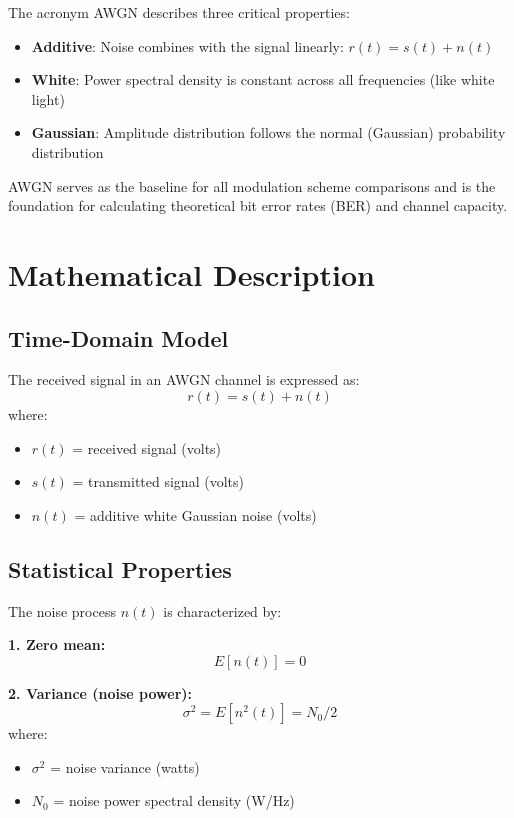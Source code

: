 The acronym AWGN describes three critical properties:

\begin{itemize}
\item \textbf{Additive}: Noise combines with the signal linearly: $r(t) = s(t) + n(t)$
\item \textbf{White}: Power spectral density is constant across all frequencies (like white light)
\item \textbf{Gaussian}: Amplitude distribution follows the normal (Gaussian) probability distribution
\end{itemize}

AWGN serves as the baseline for all modulation scheme comparisons and is the foundation for calculating theoretical bit error rates (BER) and channel capacity.

\section{Mathematical Description}

\subsection{Time-Domain Model}

The received signal in an AWGN channel is expressed as:
\begin{equation}
r(t) = s(t) + n(t)
\end{equation}
where:
\begin{itemize}
\item $r(t)$ = received signal (volts)
\item $s(t)$ = transmitted signal (volts)
\item $n(t)$ = additive white Gaussian noise (volts)
\end{itemize}

\subsection{Statistical Properties}

The noise process $n(t)$ is characterized by:

\textbf{1. Zero mean:}
\begin{equation}
E[n(t)] = 0
\end{equation}

\textbf{2. Variance (noise power):}
\begin{equation}
\sigma^2 = E[n^2(t)] = N_0/2
\end{equation}
where:
\begin{itemize}
\item $\sigma^2$ = noise variance (watts)
\item $N_0$ = noise power spectral density (W/Hz)
\end{itemize}

